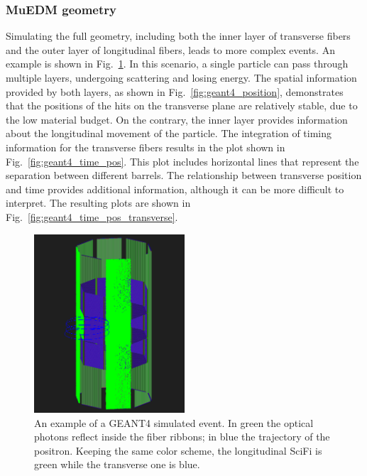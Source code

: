 \begin{refsection}
        \subsubsection{MuEDM geometry}
        Simulating the full geometry, including both the inner layer of transverse fibers and the outer layer of longitudinal fibers, leads to more complex events. 
        An example is shown in Fig.~\ref{fig:geant4_B}. In this scenario, a single particle can pass through multiple layers, undergoing scattering and losing energy. 
        The spatial information provided by both layers, as shown in Fig.~\ref{fig:geant4_position}, demonstrates that the positions of the hits on the transverse plane are relatively stable, due to the low material budget. On the contrary, the inner layer provides information about the longitudinal movement of the particle.
        The integration of timing information for the transverse fibers results in the plot shown in Fig.~\ref{fig:geant4_time_pos}. This plot includes horizontal lines that represent the separation between different barrels. 
        The relationship between transverse position and time provides additional information, although it can be more difficult to interpret. 
        The resulting plots are shown in Fig.~\ref{fig:geant4_time_pos_transverse}.

        \begin{figure}
            \centering
            \includegraphics[width=0.5\textwidth]{Figures/muEDM/Tracker/muedm_scifi_B.png}
            \caption[SciFi \gf: muEDM geometry from the proposal]{An example of a \textsc{GEANT4} simulated event. In green the optical photons reflect inside the fiber ribbons; in blue the trajectory of the positron. Keeping the same color scheme, the longitudinal SciFi is green while the transverse one is blue.}
        \label{fig:geant4_B}
        \end{figure}


\end{refsection}
